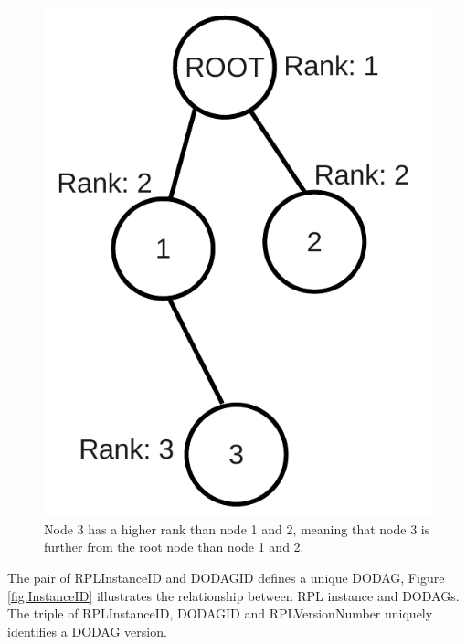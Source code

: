 \begin{figure}[htbp]
  \begin{center}
    \leavevmode
      \includegraphics[scale=0.35]{Pics/Rank.pdf}
    \caption{Node 3 has a higher rank than node 1 and 2, meaning that node 3 is further from the root node than node 1 and 2.}
    \label{fig:Rank}
  \end{center}
\end{figure}

The pair of RPLInstanceID and DODAGID defines a unique DODAG, Figure \ref{fig:InstanceID} illustrates the relationship between RPL instance and DODAGs. 
The triple of RPLInstanceID, DODAGID and RPLVersionNumber uniquely identifies a DODAG version.

